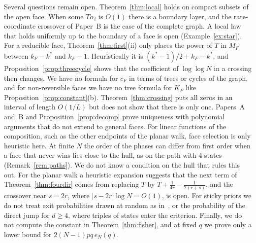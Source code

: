 Several questions remain open. Theorem~\ref{thm:local} holds on compact
subsets of the open face. When some $T\alpha_i$ is $O(1)$ there is a
boundary layer, and the rare-coordinate crossover of Paper~B is the case of
the complete graph. A local law that holds uniformly up to the boundary of
a face is open (Example~\ref{ex:star}). For a reducible face,
Theorem~\ref{thm:first}(ii) only places the power of $T$ in $M_F$ between
$k_F-k^*$ and $k_F-1$. Heuristically it is $(k^*-1)/2+k_F-k^*$, and
Proposition~\ref{prop:threecycle} shows that the coefficient of
$\log\log N$ in a crossing then changes. We have no formula for $c_F$ in
terms of trees or cycles of the graph, and for non-reversible faces we have
no tree formula for $K_F$ like Proposition~\ref{prop:constant}(b).
Theorem~\ref{thm:crossing} puts all zeros in an interval of length
$O(1/L)$ but does not show that there is only one. Papers~A and~B and
Proposition~\ref{prop:decomp} prove uniqueness with polynomial arguments
that do not extend to general faces. For linear functions of the
composition, such as the other endpoints of the planar walk, face selection
is only heuristic here. At finite $N$ the order of the phases can differ
from first order when a face that never wins lies close to the hull, as on
the path with 4 states (Remark~\ref{rem:paths}). We do not know a condition
on the hull that rules this out. For the planar walk a heuristic expansion
suggests that the next term of Theorem~\ref{thm:fourdir} comes from
replacing $T$ by $T+\frac1{4r}-\frac1{2(r+s)}$, and the crossover near
$s=2r$, where $\lvert s-2r\rvert\log N=O(1)$, is open. For sticky priors we
do not treat exit probabilities drawn at random as in~\cite{fox2011}, or the
probability of the direct jump for $d\ge4$, where triples of states enter
the criterion. Finally, we do not compute the constant in
Theorem~\ref{thm:fisher}, and at fixed $q$ we prove only a lower bound for
$2(N-1)pq\,e_N(q)$.
